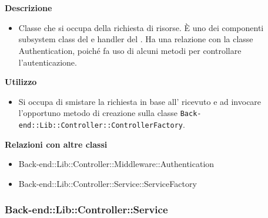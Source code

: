 				\textbf{\\ \\ Descrizione} 
					\begin{itemize}
						\item[] Classe che si occupa della richiesta di risorse. È uno dei componenti subsystem class del   e handler del  . Ha una relazione con la classe Authentication, poiché fa uso di alcuni metodi per controllare l'autenticazione.
					\end{itemize}      
				\textbf{Utilizzo}  
					\begin{itemize}
						\item[] Si occupa di smistare la richiesta in base all' ricevuto e ad invocare l'opportuno metodo di creazione sulla classe \texttt{Back-end::Lib::Controller::ControllerFactory}.
					\end{itemize}
					\textbf{Relazioni con altre classi}
					\begin{itemize}
							\item{Back-end::Lib::Controller::Middleware::Authentication}
							\item{Back-end::Lib::Controller::Service::ServiceFactory}
					\end{itemize}
	\subsubsection{Back-end::Lib::Controller::Service}
